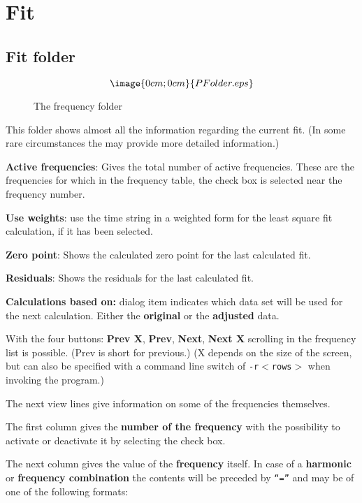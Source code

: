 \section{Fit}%
\label{period.detailed}

\subsection{Fit folder}%
\label{period.folder}

\begin{figure}[h]
$$\image{0cm;0cm}{PFolder.eps}$$%
\caption{The frequency folder}%
\label{period.folder.dialog}
\end{figure}

This folder shows almost all the information regarding the current fit. 
(In some rare circumstances the 
may provide more detailed information.)

{\bf Active frequencies}:
Gives the total number of active frequencies.
These are the frequencies for which in the frequency table,
the check box is selected near the frequency number.

{\bf Use weights}:
use the time string in a weighted form for the
least square fit calculation, if it has been selected.

{\bf Zero point}:
Shows the calculated zero point for the last calculated fit.

{\bf Residuals}:
Shows the residuals for the last calculated fit.

{\bf Calculations based on:} dialog item indicates which data set
will be used for the next calculation. Either the {\bf original} 
or the {\bf adjusted} data.

With the four buttons:
{\bf Prev X},
{\bf Prev},
{\bf Next},
{\bf Next X}
scrolling in the frequency list is possible.
(Prev is short for previous.)
(X depends on the size of the screen, 
but can also be specified with a 
command line switch of {\tt -r$ <$rows$> $} when invoking the 
program.)

The next view lines give information on some of the frequencies themselves.

The first column gives the {\bf number of the frequency}
with the possibility to activate or deactivate it by
selecting the check box.

The next column gives the value of the {\bf frequency} itself.
In case of a {\bf harmonic} or {\bf frequency combination}
the contents will be preceded by {\tt``=''} and may be 
of one of the following formats:

